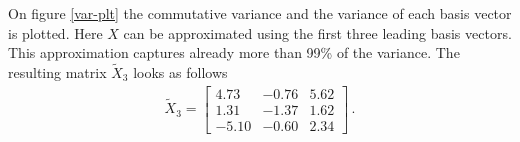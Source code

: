 On figure \ref{var-plt} the commutative variance and the variance of each basis vector is plotted.
Here \(X\) can be approximated using the first three leading basis vectors.
This approximation captures already more than 99\% of the variance.
The resulting matrix \(\tilde{X}_3\) looks as follows
\begin{gather}
\tilde{X}_3 = \begin{bmatrix}
4.73 & -0.76 & 5.62 \\
1.31 & -1.37 & 1.62 \\
-5.10 & -0.60 & 2.34
\end{bmatrix} \,.
\end{gather}



